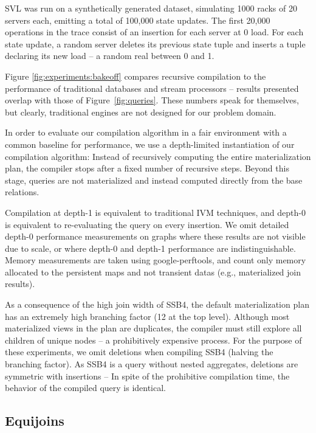 SVL was run on a synthetically generated dataset, simulating 1000 racks of 20 servers each, emitting a total of 100,000 state updates.  The first 20,000 operations in the trace consist of an insertion for each server at 0 load.  For each state update, a random server deletes its previous state tuple and inserts a tuple declaring its new load -- a random real between 0 and 1.

Figure \ref{fig:experiments:bakeoff} compares recursive compilation to the performance of traditional databases and stream processors -- results presented overlap with those of Figure~\ref{fig:queries}.  These numbers speak for themselves, but clearly, traditional engines are not designed for our problem domain.

In order to evaluate our compilation algorithm in a fair environment with a common baseline for performance, we use a depth-limited instantiation of our compilation algorithm: Instead of recursively computing the entire materialization plan, the compiler stops after a fixed number of recursive steps.  Beyond this stage, queries are not materialized and instead computed directly from the base relations.

Compilation at depth-1 is equivalent to traditional IVM techniques, and depth-0 is equivalent to re-evaluating the query on every insertion.  We omit detailed depth-0 performance measurements on graphs where these results are not visible due to scale, or where depth-0 and depth-1 performance are indistinguishable.  Memory measurements are taken using google-perftools\cite{perftools}, and count only memory allocated to the persistent maps and not transient datas (e.g., materialized join results).

As a consequence of the high join width of SSB4, the default materialization plan has an extremely high branching factor (12 at the top level).  Although most materialized views in the plan are duplicates, the compiler must still explore all children of unique nodes -- a prohibitively expensive process.  For the purpose of these experiments, we omit deletions when compiling SSB4 (halving the branching factor).  As SSB4 is a query without nested aggregates, deletions are symmetric with insertions -- In spite of the prohibitive compilation time, the behavior of the compiled query is identical.

\subsection{Equijoins}

